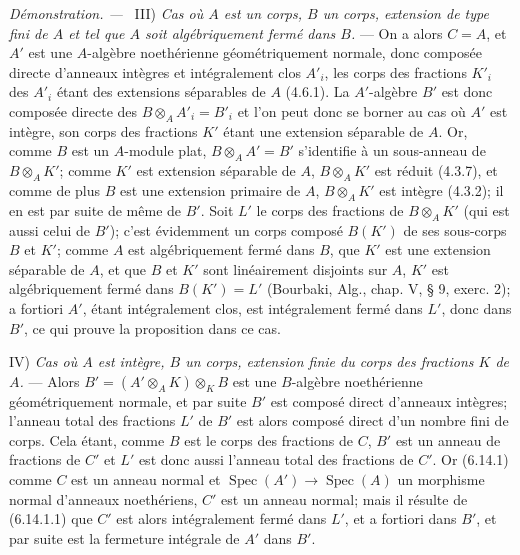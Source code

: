\documentclass[10pt,oneside]{book}
\newenvironment{proof}{%
  \par\medskip\noindent\textit{Démonstration. ---\ }}{\par}
\begin{document}
\begin{proof}
III) \emph{Cas où $A$ est un corps, $B$ un corps, extension de type fini de
$A$ et tel que $A$ soit algébriquement fermé dans $B$.} --- On a alors
$C=A$, et $A'$ est une $A$-algèbre noethérienne géométriquement normale,
donc composée directe d'anneaux intègres et intégralement clos $A'_i$, les
corps des fractions $K'_i$ des $A'_i$ étant des extensions séparables de
$A$ (4.6.1). La $A'$-algèbre $B'$ est donc composée directe des
$B\otimes_A A'_i=B'_i$ et l'on peut donc se borner au cas où $A'$ est
intègre, son corps des fractions $K'$ étant une extension séparable de $A$.
Or, comme $B$ est un $A$-module plat, $B\otimes_A A'=B'$ s'identifie à un
sous-anneau de $B\otimes_A K'$; comme $K'$ est extension séparable de $A$,
$B\otimes_A K'$ est réduit (4.3.7), et comme de plus $B$ est une extension
primaire de $A$, $B\otimes_A K'$ est intègre (4.3.2); il en est par suite
de même de $B'$. Soit $L'$ le corps des fractions de $B\otimes_A K'$ (qui
est aussi celui de $B'$); c'est évidemment un corps composé $B(K')$ de ses
sous-corps $B$ et $K'$; comme $A$ est algébriquement fermé dans $B$, que
$K'$ est une extension séparable de $A$, et que $B$ et $K'$ sont
linéairement disjoints sur $A$, $K'$ est algébriquement fermé dans
$B(K')=L'$ (Bourbaki, Alg., chap. V, § 9, exerc. 2); a fortiori $A'$, étant
intégralement clos, est intégralement fermé dans $L'$, donc dans $B'$, ce
qui prouve la proposition dans ce cas.

IV) \emph{Cas où $A$ est intègre, $B$ un corps, extension finie du corps
des fractions $K$ de $A$.} --- Alors
$B'=(A'\otimes_A K)\otimes_K B$ est une $B$-algèbre noethérienne
géométriquement normale, et par suite $B'$ est composé direct d'anneaux
intègres; l'anneau total des fractions $L'$ de $B'$ est alors composé
direct d'un nombre fini de corps. Cela étant, comme $B$ est le corps des
fractions de $C$, $B'$ est un anneau de fractions de $C'$ et $L'$ est donc
aussi l'anneau total des fractions de $C'$. Or (6.14.1) comme $C$ est un
anneau normal et $\operatorname{Spec}(A')\to\operatorname{Spec}(A)$ un
morphisme normal d'anneaux noethériens, $C'$ est un anneau normal; mais il
résulte de (6.14.1.1) que $C'$ est alors intégralement fermé dans $L'$, et
a fortiori dans $B'$, et par suite est la fermeture intégrale de $A'$ dans
$B'$.


\end{proof}
\end{document}
